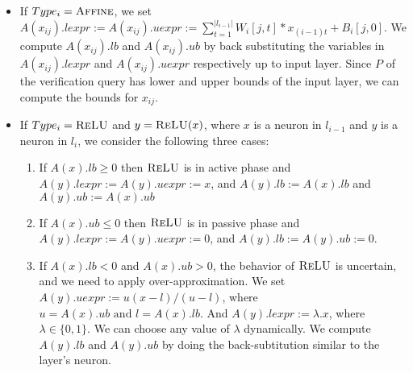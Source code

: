\begin{itemize}
\item If $Type_i= \textsc{Affine}$, we set 
  $A(x_{ij}).lexpr := A(x_{ij}).uexpr := \sum_{t=1}^{|l_{i-1}|} W_i[j,t]*x_{(i-1)t} + B_i[j,0]$.
  We compute $A(x_{ij}).lb$ and $A(x_{ij}).ub$ by back substituting
  the variables in $A(x_{ij}).lexpr$ and $A(x_{ij}).uexpr$ respectively up to input layer.
  Since $P$ of the verification query has lower and upper bounds of the input layer,
  we can compute the bounds for $x_{ij}$.

\item If $Type_i= \textsc{ReLU}$ and $y=\textsc{ReLU}(x)$,{\color{red} where $x$ is a neuron in $l_{i-1}$ and $y$ is a neuron in $l_i$}, we consider the following three cases: %
  \begin{enumerate}
  \item If $A(x).lb \geq 0$ then $\textsc{ReLU}$ is in active phase and
    $A(y).lexpr := A(y).uexpr := x$,
    and $A(y).lb := A(x).lb$ and $A(y).ub := A(x).ub$
  \item If $A(x).ub \leq 0$ then $\textsc{ReLU}$ is in passive phase and
    $A(y).lexpr := A(y).uexpr := 0$, 
    and $A(y).lb := A(y).ub := 0$.
  \item  If $A(x).lb < 0$ and $A(x).ub > 0$,
    the behavior of $\textsc{ReLU}$ is uncertain, and we need to apply
    over-approximation. We set $A(y).uexpr := u(x - l) / (u - l)$, 
    where $u = A(x).ub \text{ and } l = A(x).lb$.
    And $A(y).lexpr := \lambda . x$, where $\lambda \in \{0,1\}$. 
    We can choose any value of $\lambda$ dynamically.
    We compute $A(y).lb$ and $A(y).ub$ by doing the back-subtitution similar to the \affine{} layer's neuron.
  \end{enumerate}




\end{itemize}
